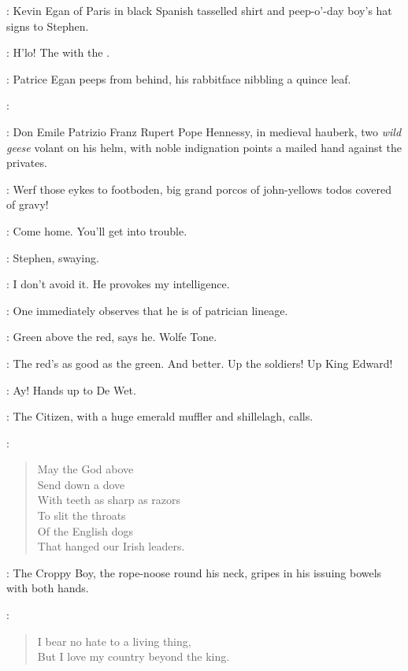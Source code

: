 :
Kevin Egan of Paris in black Spanish tasselled shirt
and peep-o'-day boy's hat signs to Stephen.

\KevinEgan:
H'lo!
The  with the .

:
Patrice Egan peeps from behind, his rabbitface nibbling a quince leaf.

\Patrice:

:
Don Emile Patrizio Franz Rupert Pope Hennessy,
in medieval hauberk, two \emph{wild geese} volant on his helm,
with noble indignation points a mailed hand against the privates.

\DonEmile:
Werf those eykes to footboden, big grand
porcos of john-yellows todos covered of gravy!

\Bloom:
Come home.
You'll get into trouble.

:
Stephen, swaying.

\Stephen:
I don't avoid it.
He provokes my intelligence.

\BiddyClap[2]:
One immediately observes that he is of patrician lineage.

\Virago[2]:
Green above the red, says he.
Wolfe Tone.

\Bawd[2]:
The red's as good as the green.
And better.
Up the soldiers!
Up King Edward!%

\ARough[2]:
Ay! Hands up to De Wet.

:
The Citizen, with a huge emerald muffler and shillelagh, calls.

\Citizen:
\begin{verse}
    May the God above\\
    Send down a dove\\
    With teeth as sharp as razors\\
    To slit the throats\\
    Of the English dogs\\
%
    That hanged our Irish leaders.
\end{verse}

:
The Croppy Boy, the rope-noose round his neck, gripes in his issuing bowels with both hands.

\CroppyBoy:
\begin{verse}
    I bear no hate to a living thing,\\
    But I love my country beyond the king.
\end{verse}

